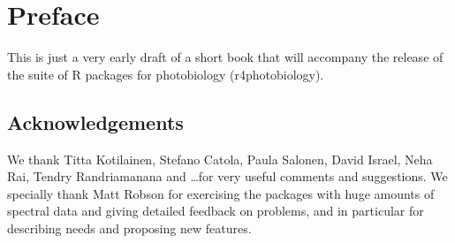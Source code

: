 \chapter{Preface}

This is just a very early draft of a short book that will accompany the release of the suite of R packages for photobiology (\textsf{r4photobiology}).

\section{Acknowledgements}

We thank Titta Kotilainen, Stefano Catola, Paula Salonen, David Israel, Neha Rai, Tendry Randriamanana and \ldots for very useful comments and suggestions. We specially thank Matt Robson for exercising the packages with huge amounts of spectral data and giving detailed feedback on problems, and in particular for describing needs and proposing new features.
